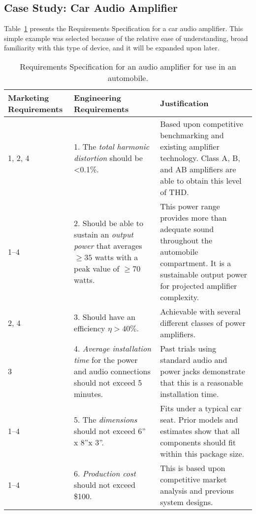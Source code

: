 \subsection{Case Study: Car Audio Amplifier}
\label{subsection:case-study-car-audio-amplifier}

Table~\ref{table:audioRequireSpec} presents the Requirements Specification for a car audio
amplifier. This simple example was selected because of the relative ease
of understanding, broad familiarity with this type of device, and it
will be expanded upon later.

\begin{table}
\centering
\caption{Requirements Specification for an audio amplifier for
use in an automobile.}
\label{table:audioRequireSpec}
\begin{tabular}{ |p{2cm}|p{5cm}|p{5cm}|} 
\hline
\rowcolor{Gray}
\textbf{Marketing Requirements} & \textbf{Engineering Requirements} & \textbf{Justification} \\ \hline
                           
1, 2, 4 &
1.  The \emph{total harmonic distortion} should be \textless0.1\%. &
Based upon competitive benchmarking and existing
amplifier technology. Class A, B, and AB amplifiers are able to obtain
this level of THD. \\ \hline

1--4 & 
2.   Should be able to sustain an \emph{output power} that averages $\ge 35$
  watts with a peak value of $\ge 70$ watts. & 
This power range provides more than adequate sound
throughout the automobile compartment. It is a sustainable output power
for projected amplifier complexity. \\ \hline

2, 4 & 
3. Should have an efficiency $\eta > 40\%$. &
Achievable with several different classes of power amplifiers. \\ \hline

3 & 
4.   \emph{Average installation time} for the power and audio connections
  should not exceed 5 minutes. &
Past trials using standard audio and power jacks
demonstrate that this is a reasonable installation time. \\ \hline

1--4 & 
5.  The \emph{dimensions} should not exceed 6'' x 8''x 3''. &
Fits under a typical car seat. Prior models and
estimates show that all components should fit within this package
size. \\ \hline

1--4 & 
6.  \emph{Production cost} should not exceed \$100. &
This is based upon competitive market analysis and previous system designs. \\ \hline


\end{tabular}
\end{table}
